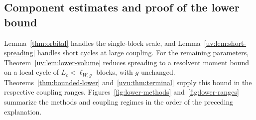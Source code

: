 \documentclass[11pt]{article}
\numberwithin{equation}{section}
\theoremstyle{remark}
\newcommand{\ellscale}{\ell_{W,g}}
\begin{document}
\subsection{Component estimates and proof of the lower bound}
\label{sec:extension-regions}

Lemma~\ref{thm:orbital} handles the single-block scale, and
Lemma~\ref{uv:lem:short-spreading} handles short cycles at large coupling.
For the remaining parameters, Theorem~\ref{uv:lem:lower-volume} reduces spreading to a
resolvent moment bound on a local cycle of $L_c<\ellscale$ blocks,
with $g$ unchanged. Theorems~\ref{thm:bounded-lower} and~\ref{uvu:thm:terminal}
supply this bound in the respective coupling ranges.
Figures~\ref{fig:lower-methods} and~\ref{fig:lower-ranges} summarize
the methods and coupling regimes in the order of the preceding explanation.
\end{document}
